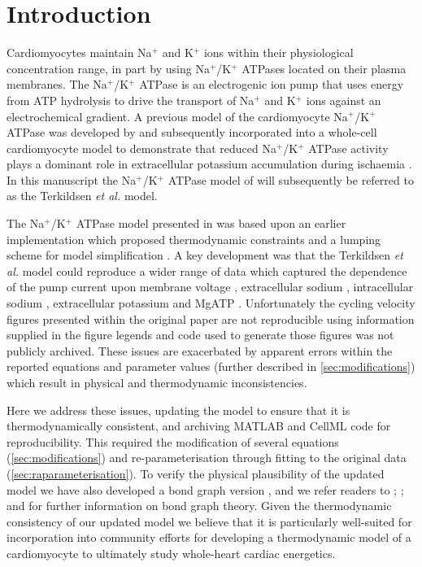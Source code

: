 \documentclass[11pt]{article}
\begin{document}
\section{Introduction}
Cardiomyocytes maintain Na$^+$ and K$^+$ ions within their physiological concentration range, in part by using Na$^+$/K$^+$ ATPases located on their plasma membranes. The Na$^+$/K$^+$ ATPase is an electrogenic ion pump that uses energy from ATP hydrolysis to drive the transport of Na$^+$ and K$^+$ ions against an electrochemical gradient. A previous model of the cardiomyocyte Na$^+$/K$^+$ ATPase was developed by \citet{terkildsen_balance_2007} and subsequently incorporated into a whole-cell cardiomyocyte model to demonstrate that reduced Na$^+$/K$^+$ ATPase activity plays a dominant role in extracellular potassium accumulation during ischaemia \citep{terkildsen_balance_2007,terkildsen_modelling_2006}. In this manuscript the Na$^+$/K$^+$ ATPase model of \citet{terkildsen_balance_2007} will subsequently be referred to as the Terkildsen \textit{et al.} model.

The Na$^+$/K$^+$ ATPase model presented in \citet{terkildsen_balance_2007} was based upon an earlier implementation which proposed thermodynamic constraints and a lumping scheme for model simplification \citep{smith_development_2004}. A key development was that the Terkildsen \textit{et al.} model could reproduce a wider range of data which captured the dependence of the pump current upon membrane voltage \citep{nakao_[na]_1989}, extracellular sodium \citep{nakao_[na]_1989}, intracellular sodium \citep{hansen_dependence_2002}, extracellular potassium \citep{nakao_[na]_1989} and MgATP \citep{friedrich_na+k+-atpase_1996}. Unfortunately the cycling velocity figures presented within the original paper are not reproducible using information supplied in the figure legends \citep[Fig. 2]{terkildsen_balance_2007} and code used to generate those figures was not publicly archived. These issues are exacerbated by apparent errors within the reported equations and parameter values (further described in \autoref{sec:modifications}) which result in physical and thermodynamic inconsistencies.

Here we address these issues, updating the model to ensure that it is thermodynamically consistent, and archiving MATLAB and CellML \citep{lloyd_cellml:_2004} code for reproducibility. This required the modification of several equations (\autoref{sec:modifications}) and re-parameterisation through fitting to the original data (\autoref{sec:raparameterisation}). To verify the physical plausibility of the updated model we have also developed a bond graph version \citep{oster_network_1971,gawthrop_energy-based_2014}, and we refer readers to \citet{gawthrop_metamodelling:_1996}; \citet{borutzky_bond_2010}; and \citet{gawthrop_bond-graph_2007} for further information on bond graph theory. Given the thermodynamic consistency of our updated model we believe that it is particularly well-suited for incorporation into community efforts for developing a thermodynamic model of a cardiomyocyte to ultimately study whole-heart cardiac energetics. 
\end{document}
